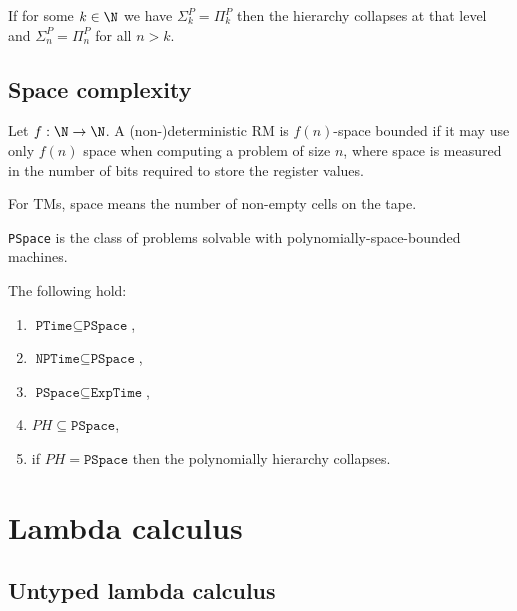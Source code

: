 \documentclass{article}
\begin{document}
\begin{theorem*}[II.26]
	If for some $k\in\N$ we have $\Sigma_k^P = \Pi_k^P$ then the hierarchy 
	collapses at that level and $\Sigma_n^P = \Pi_n^P$ for all $n>k$.
\end{theorem*}

\subsection{Space complexity}

\begin{definition*}
	Let $f:\N\to\N$.
	A (non-)deterministic RM is $f(n)$-space bounded if it may use only $f(n)$ 
	space when computing a problem of size $n$, where space is measured in the
	number of bits required to store the register values.

	For TMs, space means the number of non-empty cells on the tape.

	\texttt{PSpace} is the class of problems solvable with polynomially-space-bounded
	machines.
\end{definition*}

\begin{theorem*}[II.28]
	The following hold:
	\begin{enumerate}
		\item $\texttt{PTime}\subseteq\texttt{PSpace}$,
		\item $\texttt{NPTime}\subseteq\texttt{PSpace}$,
		\item $\texttt{PSpace}\subseteq\texttt{ExpTime}$,
		\item $PH\subseteq\texttt{PSpace}$,
		\item if $PH=\texttt{PSpace}$ then the polynomially hierarchy collapses.
	\end{enumerate}	
\end{theorem*}

\section{Lambda calculus}

\subsection{Untyped lambda calculus}
\end{document}
